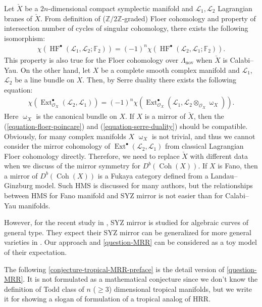 \documentclass[a4paper,dvipdfmx,reqno,12pt]{amsart}
\theoremstyle{definition}
\newcommand{\mcal}[1]{\mathcal{#1}}%
\newcommand{\opn}[1]{\operatorname{#1}}
\numberwithin{equation}{section}
\begin{document}
Let $\check{X}$ be a $2n$-dimensional 
compact symplectic manifold and 
$\mathscr{L}_1,\mathscr{L}_2$
Lagrangian branes of $\check{X}$.
From definition of ($\mathbb{Z}/2\mathbb{Z}$-graded) 
Floer cohomology and 
property of intersection number of cycles of singular 
cohomology, there exists the
following isomorphism:
\begin{align}
\label{equation-floer-poincare}
\chi (\opn{HF}^{\bullet}(\mathscr{L}_1,\mathscr{L}_2;\mathbb{F}_2))
=(-1)^{n} 
\chi(\opn{HF}^{\bullet}(\mathscr{L}_2,\mathscr{L}_1;\mathbb{F}_2)).
\end{align}
This property is also true for 
the Floer cohomology over $\Lambda_{\opn{nov}}$ when 
$\check{X}$ is Calabi--Yau.
On the other hand, let $X$ be a complete smooth 
complex manifold and $\mathcal{L}_1$, $\mathcal{L}_2$ be a
line bundle on $X$. Then, by Serre duality there exists 
the following equation:
\begin{align}
\label{equation-serre-duality}
\chi(\opn{Ext}^{\bullet}_{\mcal{O}_X}
(\mcal{L}_2,\mcal{L}_1))
= (-1)^{n}\chi(\opn{Ext}^{\bullet}_{\mcal{O}_X}
(\mcal{L}_1,\mcal{L}_2\otimes_{\mathcal{O}_X} \upomega_X)).
\end{align}
Here $\upomega_X$ is the canonical bundle on $X$.
If $X$ is a mirror of $\check{X}$, then 
the (\ref{equation-floer-poincare}) and 
(\ref{equation-serre-duality}) should be compatible.
Obviously, for many complex manifolds $X$
$\upomega_X$ is not trivial, and thus we cannot
consider the mirror cohomology of 
$\opn{Ext}^{\bullet}(\mathcal{L}_2,\mathcal{L}_1)$
from classical Lagrangian Floer cohomology directly.
Therefore, we need to replace $\check{X}$ 
with different data when we discuss of the mirror 
symmetry for $D^{b}(\opn{Coh}(X))$. 
If $X$ is Fano, then a
mirror of $D^{b}(\opn{Coh}(X))$ is a Fukaya 
category defined from a Landau--Ginzburg model.
Such HMS is discussed for many authors, 
but the relationships between HMS for 
Fano manifold and SYZ mirror is not easier than 
for Calabi--Yau manifolds.

However, for the recent study 
in \cite{auroux2022lagrangian}, 
SYZ mirror is studied for algebraic curves 
of general type. 
They expect their SYZ mirror can be generalized for more
general varieties in \cite[{}]{auroux2022lagrangian}.
Our approach and \cref{question-MRR} can be considered as 
a toy model of their expectation. 

The following \cref{conjecture-tropical-MRR-preface}
is the detail version of \cref{question-MRR}.
It is not formulated as a mathematical 
conjecture since we don't know the definition of Todd 
class of $n$ ($\geq 3$) dimensional tropical manifolds,
but we write it for showing a slogan of formulation 
of a tropical analog of HRR.
\end{document}
